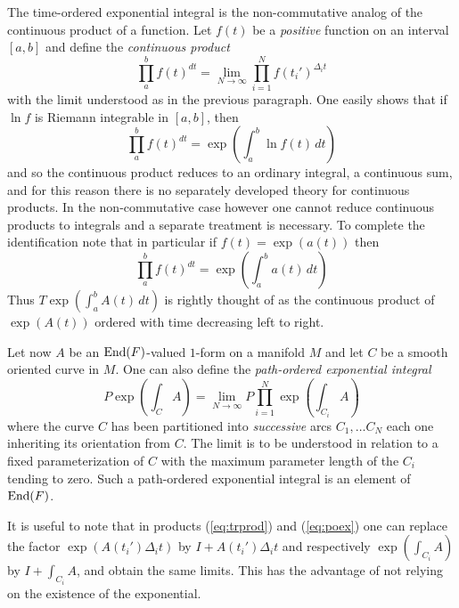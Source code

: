 \documentclass[12pt,titlepage]{article}
\def\End{\hbox{End}}
\begin{document}
The time-ordered exponential integral is the non-commutative
analog of the continuous product of a function. Let \(f(t)\) be a {\em
positive\/} function on an interval \([a,b]\) and define the {\em
continuous product\/}
%
\[
\prod_a^bf(t)^{dt} =
\lim_{N\to\infty}\prod_{i=1}^Nf(t_i')^{\Delta_it}
\]
with the limit understood as in the previous paragraph. One easily shows
that if \(\ln f\) is Riemann integrable in \([a,b]\), then
\[
\prod_a^bf(t)^{dt} = \exp\left(\int_a^b \ln f(t)\, dt\right)
\]
and so the continuous product reduces to an ordinary integral, a
continuous sum, and for this reason there is no separately developed
theory for continuous products. In the non-commutative case however one
cannot reduce continuous products to integrals and a separate treatment
is necessary. To complete the identification note that in particular if
\(f(t) = \exp(a(t))\) then
\[
\prod_a^bf(t)^{dt} = \exp\left(\int_a^b
a(t) \,dt\right)
\]
Thus    \( T \exp\left(\int_a^bA(t)\,dt\right)\)  is
rightly thought of as the continuous product of \(\exp (A(t))\) ordered
with time decreasing left to right.



Let now \(A \) be an \(\End(F)\)-valued \(1\)-form  on a manifold
\(M\) and let \(C\) be a smooth oriented curve in \(M\). One can also
define the {\em path-ordered exponential integral\/}
%
\begin{equation}\label{eq:poex}
 P \exp\left(\int_CA \right) =
 \lim_{N\to\infty} P\prod_{i=1}^N \exp\left(\int_{C_i}A \right)
 \end{equation}%
where the curve \(C\) has been partitioned into {\em successive\/} arcs
\(C_1,\dots C_N\) each one inheriting its orientation from \(C\). The
limit is to be understood in relation to a fixed parameterization of
\(C\)  with the maximum parameter length of the \(C_i\) tending to zero.
 Such
a path-ordered exponential integral is an element of \(\End(F)\).

It is useful to note that in products (\ref{eq:trprod}) and
(\ref{eq:poex}) one can replace the factor
\(\exp\left(A(t_i')\Delta_it\right)\) by \(I+A(t_i')\Delta_it\) and
respectively \(\exp\left(\int_{C_i}A \right)\) by \(I +\int_{C_i}A\),
and obtain the same limits. This has the advantage of not relying on the
existence of the exponential. 
\end{document}
